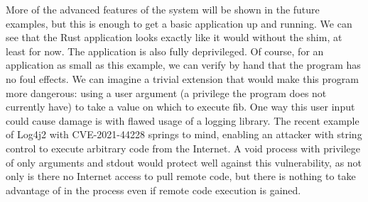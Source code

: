 \documentclass[12pt,a4paper,twoside]{report}
\begin{document}
More of the advanced features of the system will be shown in the future examples, but this is enough to get a basic application up and running. We can see that the Rust application looks exactly like it would without the shim, at least for now. The application is also fully deprivileged. Of course, for an application as small as this example, we can verify by hand that the program has no foul effects. We can imagine a trivial extension that would make this program more dangerous: using a user argument (a privilege the program does not currently have) to take a value on which to execute fib. One way this user input could cause damage is with flawed usage of a logging library. The recent example of Log4j2 with CVE-2021-44228 springs to mind, enabling an attacker with string control to execute arbitrary code from the Internet. A void process with privilege of only arguments and stdout would protect well against this vulnerability, as not only is there no Internet access to pull remote code, but there is nothing to take advantage of in the process even if remote code execution is gained.

%
\end{document}
